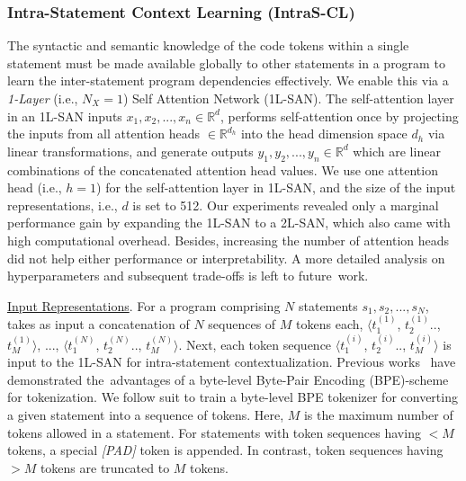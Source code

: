 \subsubsection{{\bf Intra-Statement Context Learning (IntraS-CL)}}
\label{sec:ppda_arch_intra}
The syntactic and semantic knowledge of the code tokens within a
single statement must be made available globally to other statements
in a program to learn the inter-statement program dependencies
effectively. We enable this via a \textit{1-Layer} (i.e., $N_X$$=$$1$)
Self Attention Network (1L-SAN). The self-attention layer in an 1L-SAN
inputs $x_1, x_2, ..., x_n \in \mathbb{R}^d$, performs self-attention
once by projecting the inputs from all attention heads $\in
\mathbb{R}^{d_h}$ into the head dimension space $d_h$ via linear
transformations, and generate outputs $y_1, y_2, ..., y_n \in
\mathbb{R}^d$ which are linear combinations of the concatenated
attention head values. We use one attention head
(i.e., $h$$=$$1$) for the self-attention layer in 1L-SAN, and the size
of the input representations, i.e., $d$ is set to 512. Our experiments
revealed only a marginal performance gain by expanding the 1L-SAN to a
2L-SAN, which also came with high computational
overhead. Besides, increasing the number of attention heads did not
help either performance or interpretability. A more detailed analysis
on hyperparameters and subsequent
trade-offs is left to future~work.

\vspace{1pt} \underline{Input Representations}. For a program
comprising $N$ statements $s_1, s_2, ..., s_N$, \tool takes as input a
concatenation of $N$ sequences of $M$ tokens each, $\langle
t_1^{(1)}$, $t_2^{(1)}$.., $t_M^{(1)} \rangle$, ..., $\langle
t_1^{(N)}$, $t_2^{(N)}$.., $t_M^{(N)} \rangle$. Next, each token
sequence $\langle t_1^{(i)}$, $t_2^{(i)}$.., $t_M^{(i)} \rangle$ is
input to the 1L-SAN for intra-statement contextualization. Previous
works~\cite{radford2019language, liu2019roberta} have demonstrated
the~advantages of a byte-level Byte-Pair Encoding (BPE)-scheme for
tokenization. We follow suit to train a byte-level BPE tokenizer for
converting a given statement into a sequence of tokens. Here, $M$ is
the maximum number of tokens allowed in a statement.  For statements
with token sequences having ${<}M$ tokens, a special \textit{[PAD]}
token is appended. In contrast, token sequences having ${>}M$ tokens
are truncated to $M$ tokens.


